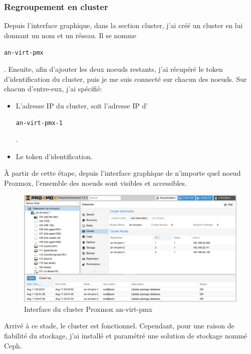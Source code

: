 \documentclass[12pt, a4paper, twoside]{article}
\begin{document}
\subsubsection{Regroupement en cluster}
Depuis l'interface graphique, dans la section \gls{cluster}, j'ai créé un \gls{cluster} en lui donnant un nom et un réseau. 
Il se nomme \begin{code}\texttt{an-virt-pmx}\end{code}.
Ensuite, afin d'ajouter les deux noeuds restants, j'ai récupéré le token d'identification du \gls{cluster}, puis je me suis connecté sur chacun des noeuds. 
Sur chacun d'entre-eux, j'ai spécifié:
\begin{itemize}
    \item L'adresse \gls{IP} du \gls{cluster}, soit l'adresse \gls{IP} d'\begin{code}\texttt{an-virt-pmx-1}\end{code}.
    \item Le token d'identification.
\end{itemize}

À partir de cette étape, depuis l'interface graphique de n'importe quel noeud \gls{Proxmox}, l'ensemble des noeuds sont visibles et accessibles.

\begin{figure}[ht!]
    \centering
        \includegraphics[width=\textwidth]{src/interface_proxmox_main.png}
    \caption{Interface du \gls{cluster} \gls{Proxmox} an-virt-pmx}
    \label{fig:proxmox_virt1}
\end{figure}

Arrivé à ce stade, le \gls{cluster} est fonctionnel. 
Cependant, pour une raison de fiabilité du stockage, j'ai installé et paramétré une solution de stockage nommé \gls{Ceph}.

\newpage
\end{document}
